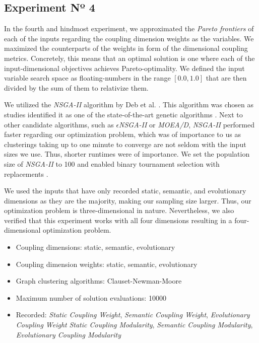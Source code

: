 \documentclass[12pt,a4paper]{report}
\begin{document}
\subsection{Experiment Nº 4}

In the fourth and hindmost experiment, we approximated the
\textit{Pareto frontiers} of each of the inputs regarding the coupling dimension
weights as the variables. We maximized the counterparts of the weights in form
of the dimensional coupling metrics. Concretely, this means that an optimal
solution is one where each of the input\hyp dimensional objectives achieves
Pareto\hyp optimality. We defined the input variable search space as
floating\hyp numbers in the range \([0.0, 1.0]\) that are then divided by
the sum of them to relativize them.

We utilized the \textit{NSGA-II} algorithm by Deb et al. \cite{deb2002fast}.
This algorithm was chosen as studies identified
it as one of the state\hyp of\hyp the\hyp art genetic algorithms
\cite{zitzler2001spea2, li2008multiobjective}. Next to other candidate
algorithms, such as \textit{$\epsilon$NSGA-II} or \textit{MOEA/D},
\textit{NSGA-II} performed faster regarding our optimization problem,
which was of importance to us as clusterings taking up to one minute to converge
are not seldom with the input sizes we use. Thus, shorter runtimes were of
importance.
We set the population size of \textit{NSGA-II} to 100 and enabled
binary tournament selection with replacements \cite{hadka2016beginner}.

We used the inputs that have only recorded static, semantic, and
evolutionary dimensions as they are the majority, making our sampling size
larger. Thus, our optimization problem is three\hyp dimensional in nature.
Nevertheless, we also verified that this experiment works with all
four dimensions resulting in a four\hyp dimensional optimization problem.
\begin{itemize}[noitemsep]
    \item Coupling dimensions: static, semantic, evolutionary
    \item Coupling dimension weights: static, semantic, evolutionary
    \item Graph clustering algorithms: Clauset-Newman-Moore
    \item Maximum number of solution evaluations: 10000
    \item Recorded:
    \textit{Static Coupling Weight},
    \textit{Semantic Coupling Weight},
    \textit{Evolutionary Coupling Weight}
    \textit{Static Coupling Modularity},
    \textit{Semantic Coupling Modularity},
    \textit{Evolutionary Coupling Modularity}
\end{itemize}
\end{document}
